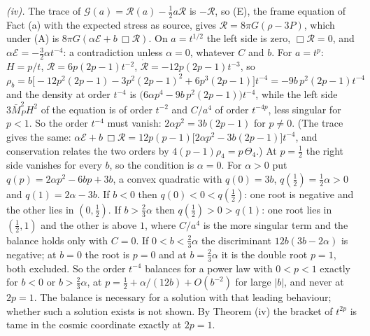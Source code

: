 \emph{(iv).} The trace of $\mathcal{G}(a) = \mathcal{R}(a) - \tfrac12 a\mathcal{R}$ is $-\mathcal{R}$, so (E), the frame equation of Fact (a) with the expected stress as source, gives $\mathcal{R} = 8\pi G(\rho - 3P)$, which under (A) is $8\pi G(\alpha\mathcal{E} + b\,\Box\mathcal{R})$. On $a = t^{1/2}$ the left side is zero, $\Box\mathcal{R} = 0$, and $\alpha\mathcal{E} = -\tfrac32\alpha t^{-4}$: a contradiction unless $\alpha = 0$, whatever $C$ and $b$. For $a = t^{p}$: $H = p/t$, $\mathcal{R} = 6p(2p - 1)t^{-2}$, $\dot{\mathcal{R}} = -12p(2p - 1)t^{-3}$, so $\rho_{b} = b\bigl[-12p^{2}(2p - 1) - 3p^{2}(2p - 1)^{2} + 6p^{3}(2p - 1)\bigr]t^{-4} = -9b\,p^{2}(2p - 1)t^{-4}$ and the density at order $t^{-4}$ is $\bigl(6\alpha p^{4} - 9b\,p^{2}(2p - 1)\bigr)t^{-4}$, while the left side $3\bar{M}_{P}^{2}H^{2}$ of the equation is of order $t^{-2}$ and $C/a^{4}$ of order $t^{-4p}$, less singular for $p < 1$. So the order $t^{-4}$ must vanish: $2\alpha p^{2} = 3b(2p - 1)$ for $p \neq 0$. (The trace gives the same: $\alpha\mathcal{E} + b\,\Box\mathcal{R} = 12p(p - 1)\bigl[2\alpha p^{2} - 3b(2p - 1)\bigr]t^{-4}$, and conservation relates the two orders by $4(p - 1)\rho_{4} = p\,\Theta_{4}$.) At $p = \tfrac12$ the right side vanishes for every $b$, so the condition is $\alpha = 0$. For $\alpha > 0$ put $q(p) = 2\alpha p^{2} - 6bp + 3b$, a convex quadratic with $q(0) = 3b$, $q(\tfrac12) = \tfrac12\alpha > 0$ and $q(1) = 2\alpha - 3b$. If $b < 0$ then $q(0) < 0 < q(\tfrac12)$: one root is negative and the other lies in $(0, \tfrac12)$. If $b > \tfrac23\alpha$ then $q(\tfrac12) > 0 > q(1)$: one root lies in $(\tfrac12, 1)$ and the other is above $1$, where $C/a^{4}$ is the more singular term and the balance holds only with $C = 0$. If $0 < b < \tfrac23\alpha$ the discriminant $12b(3b - 2\alpha)$ is negative; at $b = 0$ the root is $p = 0$ and at $b = \tfrac23\alpha$ it is the double root $p = 1$, both excluded. So the order $t^{-4}$ balances for a power law with $0 < p < 1$ exactly for $b < 0$ or $b > \tfrac23\alpha$, at $p = \tfrac12 + \alpha/(12b) + O(b^{-2})$ for large $|b|$, and never at $2p = 1$. The balance is necessary for a solution with that leading behaviour; whether such a solution exists is not shown. By Theorem (iv) the bracket of $t^{2p}$ is tame in the cosmic coordinate exactly at $2p = 1$.

